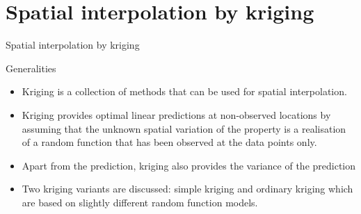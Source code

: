 \documentclass[8pt]{beamer}
\renewcommand{\emph}[1]{\textcolor{myorange}{#1}}
\begin{document}
\section{Spatial interpolation by kriging}
\begin{frame}{Spatial interpolation by kriging}
    \begin{block}{Generalities}
    \end{block}
    \begin{itemize}
        \item \alert{Kriging} is a collection of methods that can be used for \emph{spatial interpolation}.
        \item \alert{Kriging} provides \emph{optimal linear predictions} at non-observed locations by assuming that the unknown \emph{spatial variation} of the property is a realisation of a \emph{random function} that has been observed at the data points only.
        \item Apart from the prediction, \emph{kriging} also provides the \emph{variance} of the prediction
        \item Two \emph{kriging} variants are discussed: \alert{simple kriging} and \alert{ordinary kriging} which are based on slightly different \emph{random function} models.
    \end{itemize}
\end{frame}
\end{document}
